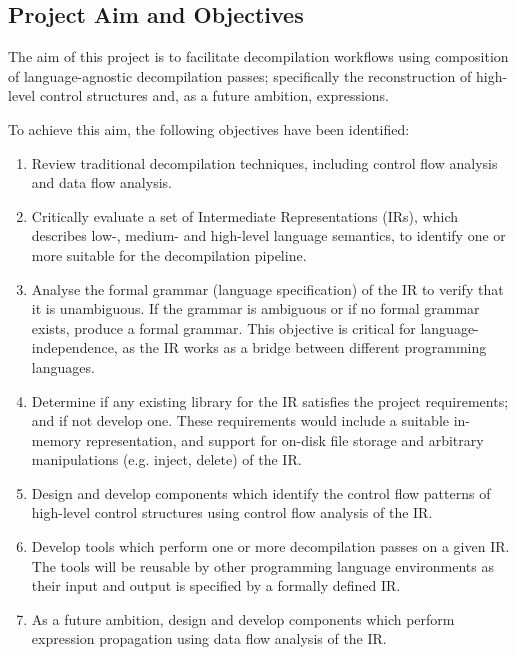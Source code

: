 
\subsection{Project Aim and Objectives}
\label{sec:intro_project_aim_and_objectives}

The aim of this project is to facilitate decompilation workflows using composition of language-agnostic decompilation passes; specifically the reconstruction of high-level control structures and, as a future ambition, expressions.

To achieve this aim, the following objectives have been identified:

\begin{enumerate}
	\item \label{itm:obj_review_decomp_techniques} Review traditional decompilation techniques, including control flow analysis and data flow analysis.
	\item \label{itm:obj_review_suitable_ir} Critically evaluate a set of Intermediate Representations (IRs), which describes low-, medium- and high-level language semantics, to identify one or more suitable for the decompilation pipeline.
	\item \label{itm:obj_formal_ir} Analyse the formal grammar (language specification) of the IR to verify that it is unambiguous. If the grammar is ambiguous or if no formal grammar exists, produce a formal grammar. This objective is critical for language-independence, as the IR works as a bridge between different programming languages.
	\item \label{itm:obj_ir_library} Determine if any existing library for the IR satisfies the project requirements; and if not develop one. These requirements would include a suitable in-memory representation, and support for on-disk file storage and arbitrary manipulations (e.g. inject, delete) of the IR.
	\item \label{itm:obj_control_flow_analysis_component} Design and develop components which identify the control flow patterns of high-level control structures using control flow analysis of the IR.
	\item \label{itm:obj_decomp_pass_tool} Develop tools which perform one or more decompilation passes on a given IR. The tools will be reusable by other programming language environments as their input and output is specified by a formally defined IR.
	\item \label{itm:obj_data_analysis_library} As a future ambition, design and develop components which perform expression propagation using data flow analysis of the IR.
\end{enumerate}
